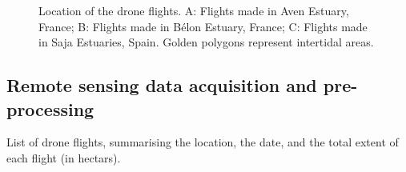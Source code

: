 \documentclass[
  letterpaper,
  DIV=11,
  numbers=noendperiod]{scrartcl}
\begin{document}
\label{cell-fig-location_sites}
\begin{figure}[H]


\caption{\label{fig-location_sites}Location of the drone flights. A:
Flights made in Aven Estuary, France; B: Flights made in Bélon Estuary,
France; C: Flights made in Saja Estuaries, Spain. Golden polygons
represent intertidal areas.}

\end{figure}%

\subsection{Remote sensing data acquisition and
pre-processing}\label{sec-DroneFlights}

\begin{table}

\caption{\label{tbl-flights}List of drone flights, summarising the
location, the date, and the total extent of each flight (in hectars).}


\end{table}%
\end{document}
